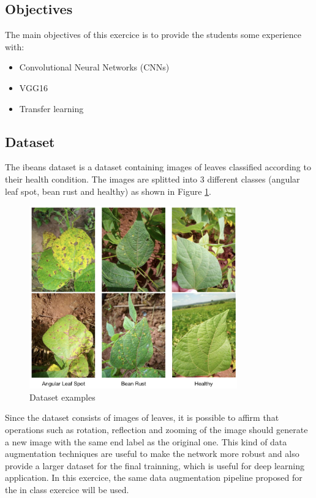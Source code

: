 \documentclass[10pt, a4paper]{article}
\begin{document}
\subsection{Objectives}

The main objectives of this exercice is to provide the students some experience with:

\begin{itemize}
  \item Convolutional Neural Networks (CNNs)
  \item VGG16
  \item Transfer learning
\end{itemize}

\subsection{Dataset}

The ibeans dataset is a dataset containing images of leaves classified according to their health condition. 
The images are splitted into 3 different classes (angular leaf spot, bean rust and healthy) as shown in Figure \ref{fig:examples}.

\begin{figure}[htpb]
  \centering
  \includegraphics[width=0.8\textwidth]{images/bean-example-data.png}
  \caption{Dataset examples}
  \label{fig:examples}
\end{figure}

Since the dataset consists of images of leaves, it is possible to affirm that operations such as rotation, reflection and zooming of the image should
generate a new image with the same end label as the original one. This kind of data augmentation techniques are useful to make the network more robust
and also provide a larger dataset for the final trainning, which is useful for deep learning application. In this exercice, the same data augmentation
pipeline proposed for the in class exercice will be used.
\end{document}

